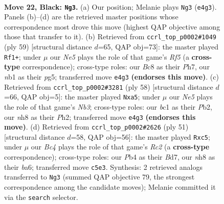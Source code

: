 \documentclass[11pt]{article}
\begin{document}
\clearpage

\begin{figure}[p]\centering
\begin{subfigure}{0.46\textwidth}\centering
\resizebox{\linewidth}{!}{%
\newchessgame
\chessboard[
  setfen={r1b4N/2k5/2p1p1p1/P1b4p/1p2nP1P/4P3/8/RNB3K1 b - - 1 22},
  showmover=false,
  pgfstyle=straightmove, color=movearrow, markmove={e4-g3}
]}
\caption{}
\end{subfigure}\hfill
\begin{subfigure}{0.46\textwidth}\centering
\resizebox{\linewidth}{!}{%
\newchessgame
\chessboard[
  setfen={6k1/2N2p1p/p5p1/2pp1bP1/5r2/1P6/1PPR3P/1K6 b - - 1 30},
  showmover=false,
  pgfstyle=straightmove, color=movearrow, markmove={f4-f1}
]}
\caption{}
\end{subfigure}
\\[4pt]
\begin{subfigure}{0.46\textwidth}\centering
\resizebox{\linewidth}{!}{%
\newchessgame
\chessboard[
  setfen={2R5/3rbppk/4p2p/p7/pn2P3/1NB3P1/1P3P1P/5K2 w - - 0 30},
  showmover=false,
  pgfstyle=straightmove, color=movearrow, markmove={b3-a5}
]}
\caption{}
\end{subfigure}\hfill
\begin{subfigure}{0.46\textwidth}\centering
\resizebox{\linewidth}{!}{%
\newchessgame
\chessboard[
  setfen={5bk1/2rb1p2/B3p1pp/1pP1P3/3N3P/4P3/P3K1P1/2R5 b - - 2 26},
  showmover=false,
  pgfstyle=straightmove, color=movearrow, markmove={c7-c5}
]}
\caption{}
\end{subfigure}
\caption{\textbf{Move 22, Black: \texttt{Ng3}.} (a) Our position; Melanie plays \texttt{Ng3} (\texttt{e4g3}). Panels (b)--(d) are the retrieved master positions whose correspondence most drove this move (highest QAP objective among those that transfer to it). (b) Retrieved from \texttt{ccrl\_top\_p0002\#1049} (ply 59) [structural distance $d$=65, QAP obj=73]: the master played \texttt{Rf1+}; under $\mu$ our \emph{Ne5} plays the role of that game's \emph{Rf5} (a \textbf{cross-type} correspondence); cross-type roles: our \emph{B}c8 as their \emph{P}h7, our \emph{n}b1 as their \emph{p}g5; transferred move \texttt{e4g3} \textbf{(endorses this move)}. (c) Retrieved from \texttt{ccrl\_top\_p0002\#3281} (ply 58) [structural distance $d$=66, QAP obj=5]: the master played \texttt{Nxa5}; under $\mu$ our \emph{Ne5} plays the role of that game's \emph{Nb3}; cross-type roles: our \emph{b}c1 as their \emph{P}b2, our \emph{n}h8 as their \emph{P}h2; transferred move \texttt{e4g3} \textbf{(endorses this move)}. (d) Retrieved from \texttt{ccrl\_top\_p0002\#2626} (ply 51) [structural distance $d$=58, QAP obj=56]: the master played \texttt{Rxc5}; under $\mu$ our \emph{Bc4} plays the role of that game's \emph{Rc2} (a \textbf{cross-type} correspondence); cross-type roles: our \emph{P}b4 as their \emph{B}d7, our \emph{n}h8 as their \emph{b}a6; transferred move \texttt{c5e3}. Synthesis: 2 retrieved analogs transferred to \texttt{Ng3} (summed QAP objective 79, the strongest correspondence among the candidate moves); Melanie committed it via the \texttt{search} selector.}
\label{fig:thought-m43}
\end{figure}
\end{document}
